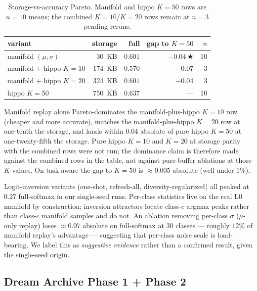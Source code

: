 \documentclass[11pt]{article}
\newcommand{\headline}{$\bigstar$}
\begin{document}
\begin{table}[h]
  \centering
  \caption{Storage-vs-accuracy Pareto. Manifold and hippo $K = 50$
           rows are $n = 10$ means; the combined $K = 10/K = 20$ rows
           remain at $n = 3$ pending reruns.}
  \label{tab:pareto}
  \begin{tabular}{lrrrr}
    \toprule
    variant                          & storage   & full    & gap to $K = 50$ & $n$ \\
    \midrule
    manifold $(\mu, \sigma)$         & 30~KB     & $0.601$ & $-0.04$\,\headline & 10 \\
    manifold $+$ hippo $K = 10$      & 174~KB    & $0.570$ & $-0.07$         & 3   \\
    manifold $+$ hippo $K = 20$      & 324~KB    & $0.601$ & $-0.04$         & 3   \\
    hippo $K = 50$                   & 750~KB    & $0.637$ & ---             & 10  \\
    \bottomrule
  \end{tabular}
\end{table}

Manifold replay alone Pareto-dominates the manifold-plus-hippo
$K = 10$ row (cheaper \emph{and} more accurate), matches the
manifold-plus-hippo $K = 20$ row at one-tenth the storage, and lands
within $0.04$ absolute of pure hippo $K = 50$ at one-twenty-fifth the
storage. Pure hippo $K = 10$ and $K = 20$ at storage parity with the
combined rows were not run; the dominance claim is therefore made
against the combined rows in the table, not against pure-buffer
ablations at those $K$ values. On task-aware the gap to $K = 50$ is
$\approx 0.005$ absolute (well under $1\%$).

Logit-inversion variants \citep{yin2020deepinversion} (one-shot, refresh-all,
diversity-regularized) all peaked at $0.27$ full-softmax in our
single-seed runs. Per-class statistics live on the real L0 manifold by
construction; inversion attractors locate class-$c$ argmax peaks rather
than class-$c$ manifold samples and do not. An ablation removing per-class $\sigma$ ($\mu$-only replay)
loses $\approx\!0.07$ absolute on full-softmax at 30 classes ---
roughly $12\%$ of manifold replay's advantage --- suggesting that
per-class noise scale is load-bearing. We label this as
\emph{suggestive evidence} rather than a confirmed result, given the
single-seed origin.

\subsection{Dream Archive Phase 1 + Phase 2}
\label{sec:archive-results}
\end{document}
